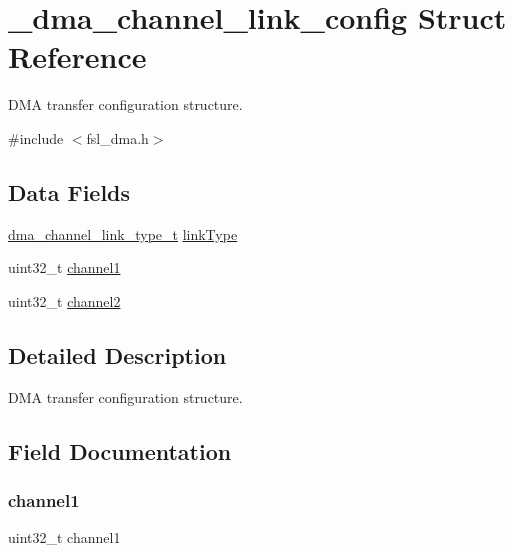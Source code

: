 \hypertarget{struct__dma__channel__link__config}{}\section{\+\_\+dma\+\_\+channel\+\_\+link\+\_\+config Struct Reference}
\label{struct__dma__channel__link__config}


D\+MA transfer configuration structure.  




{\ttfamily \#include $<$fsl\+\_\+dma.\+h$>$}

\subsection*{Data Fields}
\begin{DoxyCompactItemize}
\item 
\mbox{\hyperlink{group__dma_ga3ee1ff3a58659ae3e61603b672b0a2fb}{dma\+\_\+channel\+\_\+link\+\_\+type\+\_\+t}} \mbox{\hyperlink{struct__dma__channel__link__config_a25aac2215fe115938f3cdf9e575beed1}{link\+Type}}
\item 
uint32\+\_\+t \mbox{\hyperlink{struct__dma__channel__link__config_a9dce966b13d986333ed5a0b5ab1fe956}{channel1}}
\item 
uint32\+\_\+t \mbox{\hyperlink{struct__dma__channel__link__config_a06ad26bec06cf3a7a6300bc7185bca0d}{channel2}}
\end{DoxyCompactItemize}


\subsection{Detailed Description}
D\+MA transfer configuration structure. 

\subsection{Field Documentation}
\mbox{\label{struct__dma__channel__link__config_a9dce966b13d986333ed5a0b5ab1fe956}} 
\subsubsection{\texorpdfstring{channel1}{channel1}}
{\footnotesize\ttfamily uint32\+\_\+t channel1}

